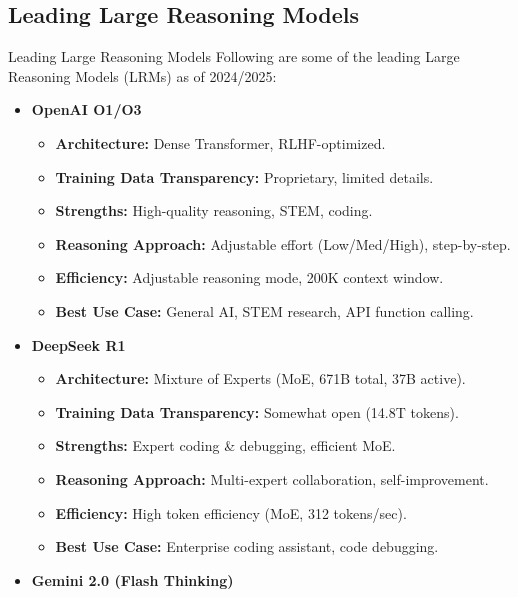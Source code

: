\subsection{Leading Large Reasoning Models}
\begin{frame}[allowframebreaks]{Leading Large Reasoning Models}
    \large Following are some of the leading Large Reasoning Models (LRMs) as of 2024/2025:
    \vspace{0.5em}
    \begin{itemize}
        \item \textbf{OpenAI O1/O3}
        \begin{itemize}
            \item \textbf{Architecture:} Dense Transformer, RLHF-optimized.
            \item \textbf{Training Data Transparency:} Proprietary, limited details.
            \item \textbf{Strengths:} High-quality reasoning, STEM, coding.
            \item \textbf{Reasoning Approach:} Adjustable effort (Low/Med/High), step-by-step.
            \item \textbf{Efficiency:} Adjustable reasoning mode, 200K context window.
            \item \textbf{Best Use Case:} General AI, STEM research, API function calling.
        \end{itemize}
    \framebreak
        \item \textbf{DeepSeek R1}
        \begin{itemize}
            \item \textbf{Architecture:} Mixture of Experts (MoE, 671B total, 37B active).
            \item \textbf{Training Data Transparency:} Somewhat open (14.8T tokens).
            \item \textbf{Strengths:} Expert coding \& debugging, efficient MoE.
            \item \textbf{Reasoning Approach:} Multi-expert collaboration, self-improvement.
            \item \textbf{Efficiency:} High token efficiency (MoE, 312 tokens/sec).
            \item \textbf{Best Use Case:} Enterprise coding assistant, code debugging.
        \end{itemize}
    \framebreak
        \item \textbf{Gemini 2.0 (Flash Thinking)}
        \begin{itemize}

\end{itemize}
\end{itemize}
\end{frame}
